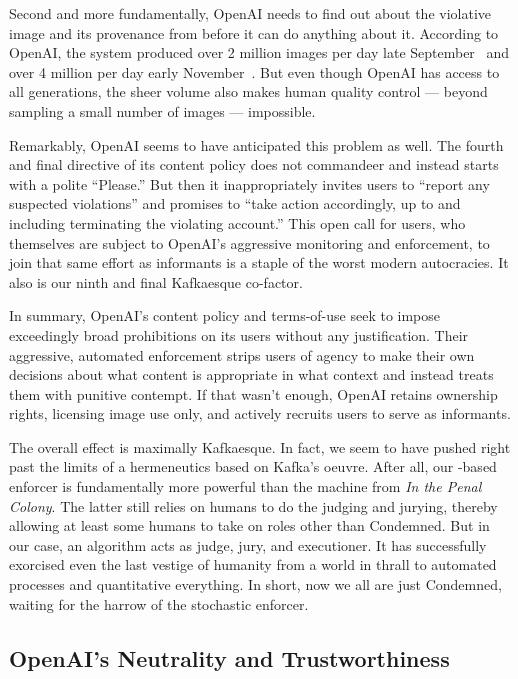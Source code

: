 Second and more fundamentally, OpenAI needs to find out about the violative
image and its provenance from \DALLE before it can do anything about it.
According to OpenAI, the system produced over 2 million images per day late
September~\cite{OpenAI2022a} and over 4 million per day early
November~\cite{OpenAI2022h}. But even though OpenAI has access to all
generations, the sheer volume also makes human quality control --- beyond
sampling a small number of images --- impossible.

Remarkably, OpenAI seems to have anticipated this problem as well. The fourth
and final directive of its content policy does not commandeer and instead starts
with a polite “Please.” But then it inappropriately invites users to “report any
suspected violations” and promises to “take action accordingly, up to and
including terminating the violating account.” This open call for users, who
themselves are subject to OpenAI's aggressive monitoring and enforcement, to
join that same effort as informants is a staple of the worst modern autocracies.
It also is our ninth and final Kafkaesque co-factor.

In summary, OpenAI's content policy and terms-of-use seek to impose exceedingly
broad prohibitions on its users without any justification. Their aggressive,
automated enforcement strips users of agency to make their own decisions about
what content is appropriate in what context and instead treats them with
punitive contempt. If that wasn't enough, OpenAI retains ownership rights,
licensing image use only, and actively recruits users to serve as informants.

The overall effect is maximally Kafkaesque. In fact, we seem to have pushed
right past the limits of a hermeneutics based on Kafka's oeuvre. After all, our
\AI-based enforcer is fundamentally more powerful than the machine from \emph{In
the Penal Colony}. The latter still relies on humans to do the judging and
jurying, thereby allowing at least some humans to take on roles other than
Condemned. But in our case, an algorithm acts as judge, jury, and executioner.
It has successfully exorcised even the last vestige of humanity from a world in
thrall to automated processes and quantitative everything. In short, now we all
are just Condemned, waiting for the harrow of the stochastic enforcer.


\subsection{OpenAI's Neutrality and Trustworthiness}

